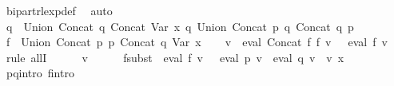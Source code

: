 \begin{isabellebody}
\ bipart{\isacharunderscore}{\kern0pt}rlexp{\isacharunderscore}{\kern0pt}def\ \isamarkupfalse%
\ auto\isanewline
\ \ \isamarkupfalse%
\ {\isacharquery}{\kern0pt}q{\isacharprime}{\kern0pt}\ {\isacharequal}{\kern0pt}\ {\isachardoublequoteopen}Union\ {\isacharparenleft}{\kern0pt}Concat\ q{}\ {\isacharparenleft}{\kern0pt}Concat\ {\isacharparenleft}{\kern0pt}Var\ x{\isacharparenright}{\kern0pt}\ q{}{\isacharparenright}{\kern0pt}{\isacharparenright}{\kern0pt}\ {\isacharparenleft}{\kern0pt}Union\ {\isacharparenleft}{\kern0pt}Concat\ p{}\ q{}{\isacharparenright}{\kern0pt}\ {\isacharparenleft}{\kern0pt}Concat\ q{}\ p{}{\isacharparenright}{\kern0pt}{\isacharparenright}{\kern0pt}{\isachardoublequoteclose}\isanewline
\ \ \isamarkupfalse%
\ {\isacharquery}{\kern0pt}f{\isacharprime}{\kern0pt}\ {\isacharequal}{\kern0pt}\ {\isachardoublequoteopen}Union\ {\isacharparenleft}{\kern0pt}Concat\ p{}\ p{}{\isacharparenright}{\kern0pt}\ {\isacharparenleft}{\kern0pt}Concat\ {\isacharquery}{\kern0pt}q{\isacharprime}{\kern0pt}\ {\isacharparenleft}{\kern0pt}Var\ x{\isacharparenright}{\kern0pt}{\isacharparenright}{\kern0pt}{\isachardoublequoteclose}\isanewline
\ \ \isamarkupfalse%
\ {\isachardoublequoteopen}{\isasymforall}v{\isachardot}{\kern0pt}\ {\isacharparenleft}{\kern0pt}{\isasymPsi}\ {\isacharparenleft}{\kern0pt}eval\ {\isacharparenleft}{\kern0pt}Concat\ f{}\ f{}{\isacharparenright}{\kern0pt}\ v{\isacharparenright}{\kern0pt}\ {\isacharequal}{\kern0pt}\ {\isasymPsi}\ {\isacharparenleft}{\kern0pt}eval\ {\isacharquery}{\kern0pt}f{\isacharprime}{\kern0pt}\ v{\isacharparenright}{\kern0pt}{\isacharparenright}{\kern0pt}{\isachardoublequoteclose}\isanewline
\ \ \isamarkupfalse%
\ {\isacharparenleft}{\kern0pt}rule\ allI{\isacharparenright}{\kern0pt}\isanewline
\ \ \ \ \isamarkupfalse%
\ v\isanewline
\ \ \ \ \isamarkupfalse%
\ f{}{\isacharunderscore}{\kern0pt}subst{\isacharcolon}{\kern0pt}\ {\isachardoublequoteopen}{\isasymPsi}\ {\isacharparenleft}{\kern0pt}eval\ f{}\ v{\isacharparenright}{\kern0pt}\ {\isacharequal}{\kern0pt}\ {\isasymPsi}\ {\isacharparenleft}{\kern0pt}eval\ p{}\ v\ {\isasymunion}\ eval\ q{}\ v\ {\isacharat}{\kern0pt}{\isacharat}{\kern0pt}\ v\ x{\isacharparenright}{\kern0pt}{\isachardoublequoteclose}\isanewline
\ \ \ \ \ \ \isamarkupfalse%
\ p{}{\isacharunderscore}{\kern0pt}q{}{\isacharunderscore}{\kern0pt}intro\ f{}{\isacharprime}{\kern0pt}{\isacharunderscore}{\kern0pt}intro\ \isamarkupfalse%

\end{isabellebody}
